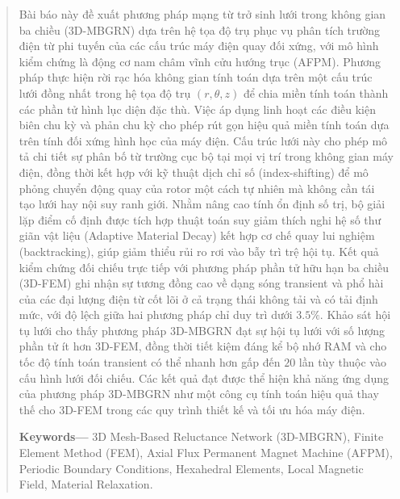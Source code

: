 \begin{abstract}
Bài báo này đề xuất phương pháp mạng từ trở sinh lưới trong không gian ba chiều (3D-MBGRN) dựa trên hệ tọa độ trụ phục vụ phân tích trường điện từ phi tuyến của các cấu trúc máy điện quay đối xứng, với mô hình kiểm chứng là động cơ nam châm vĩnh cửu hướng trục (AFPM). Phương pháp thực hiện rời rạc hóa không gian tính toán dựa trên một cấu trúc lưới đồng nhất trong hệ tọa độ trụ $(r, \theta, z)$ để chia miền tính toán thành các phần tử hình lục diện đặc thù. Việc áp dụng linh hoạt các điều kiện biên chu kỳ và phản chu kỳ cho phép rút gọn hiệu quả miền tính toán dựa trên tính đối xứng hình học của máy điện. Cấu trúc lưới này cho phép mô tả chi tiết sự phân bố từ trường cục bộ tại mọi vị trí trong không gian máy điện, đồng thời kết hợp với kỹ thuật dịch chỉ số (index-shifting) để mô phỏng chuyển động quay của rotor một cách tự nhiên mà không cần tái tạo lưới hay nội suy ranh giới. Nhằm nâng cao tính ổn định số trị, bộ giải lặp điểm cố định được tích hợp thuật toán suy giảm thích nghi hệ số thư giãn vật liệu (Adaptive Material Decay) kết hợp cơ chế quay lui nghiệm (backtracking), giúp giảm thiểu rủi ro rơi vào bẫy trì trệ hội tụ. Kết quả kiểm chứng đối chiếu trực tiếp với phương pháp phần tử hữu hạn ba chiều (3D-FEM) ghi nhận sự tương đồng cao về dạng sóng transient và phổ hài của các đại lượng điện từ cốt lõi ở cả trạng thái không tải và có tải định mức, với độ lệch giữa hai phương pháp chỉ duy trì dưới $3.5\%$. Khảo sát hội tụ lưới cho thấy phương pháp 3D-MBGRN đạt sự hội tụ lưới với số lượng phần tử ít hơn 3D-FEM, đồng thời tiết kiệm đáng kể bộ nhớ RAM và cho tốc độ tính toán transient có thể nhanh hơn gấp đến $20$ lần tùy thuộc vào cấu hình lưới đối chiếu. Các kết quả đạt được thể hiện khả năng ứng dụng của phương pháp 3D-MBGRN như một công cụ tính toán hiệu quả thay thế cho 3D-FEM trong các quy trình thiết kế và tối ưu hóa máy điện.

\textbf{Keywords---} 3D Mesh-Based Reluctance Network (3D-MBGRN), Finite Element Method (FEM), Axial Flux Permanent Magnet Machine (AFPM), Periodic Boundary Conditions, Hexahedral Elements, Local Magnetic Field, Material Relaxation.
\end{abstract}